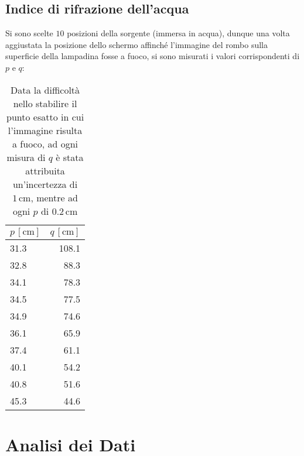 \documentclass{article}[a4paper,11pt]
\begin{document}
\subsection*{Indice di rifrazione dell'acqua}
Si sono scelte $10$ posizioni della sorgente (immersa in acqua), dunque una volta aggiustata la posizione dello schermo affinché l'immagine del rombo sulla superficie della lampadina fosse a fuoco, si sono misurati i valori corrispondenti di $p$ e $q$:
\begin{table}[!htb]
  \begin{center}
	\begin{tabular}{lr}
	\toprule
	$p \, [\si{\cm}]$ & $q \, [\si{\cm}]$ \\
	\midrule
	\midrule
	31.3 & 108.1 \\
	32.8 & 88.3 \\
	34.1 & 78.3 \\
	34.5 & 77.5 \\
	34.9 & 74.6 \\
	36.1 & 65.9 \\
	37.4 & 61.1 \\
	40.1 & 54.2 \\
	40.8 & 51.6 \\
	45.3 & 44.6 \\
	\bottomrule
	\end{tabular}
  \end{center}
  \caption{Data la difficoltà nello stabilire il punto esatto in cui l’immagine risulta a fuoco, ad ogni misura di $q$ è stata attribuita un’incertezza di $1 \, \si{\cm}$, mentre ad ogni $p$ di $0.2 \, \si{\cm}$ \label{tab:acqua}}
\end{table}

\section{Analisi dei Dati} 
\end{document}
